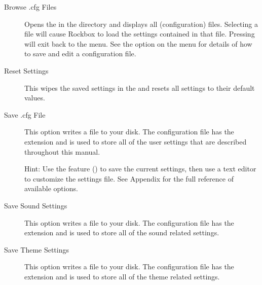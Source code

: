 \begin{description}

\item [Browse .cfg Files]Opens the  in the
   directory and displays all  (configuration)
  files. Selecting a  file will cause Rockbox to load the settings
  contained in that file. Pressing \ActionStdCancel{} will exit back to the
   menu. See the  option on
  the  menu for details of how to save and edit a
  configuration file.

\item [Reset Settings]This wipes the saved settings
  in the \dap{} and resets all settings to their default values.


\item [Save .cfg File]This option writes a  file to
  your \daps{} disk. The configuration file has the 
  extension and is used to store all of the user settings that are described
  throughout this manual.

  Hint: Use the  feature () to save the current settings, then
  use a text editor to customize the settings file. See Appendix
   for the full reference of available
  options.

\item [Save Sound Settings]This option writes a  file to
  your \daps{} disk. The configuration file has the 
  extension and is used to store all of the sound related settings.

\item [Save Theme Settings]This option writes a  file to
  your \daps{} disk. The configuration file has the 
  extension and is used to store all of the theme related settings.

\end{description}

